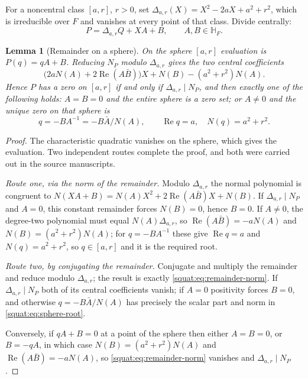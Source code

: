 \documentclass[11pt,letterpaper]{article}
\numberwithin{equation}{section}
\newtheorem{lemma}[lemma]{Lemma}
\theoremstyle{definition}
\theoremstyle{remark}
\newcommand{\HF}{\mathbb H_F}
\newcommand{\Rea}{\operatorname{Re}}
\begin{document}
For a noncentral class $[a,r]$, $r>0$, set $\Delta_{a,r}(X)=X^2-2aX+a^2+r^2$, which is
irreducible over $F$ and vanishes at every point of that class. Divide centrally:
\begin{equation}\label{squat:eq:sphereremainder}
 P=\Delta_{a,r}Q+XA+B,\qquad A,B\in\HF .
\end{equation}

\begin{lemma}[Remainder on a sphere]\label{squat:lem:sphere-remainder}
On the sphere $[a,r]$ evaluation is $P(q)=qA+B$. Reducing $N_P$ modulo $\Delta_{a,r}$
gives the two central coefficients
\begin{equation}\label{squat:eq:remainder-norm}
 \bigl(2aN(A)+2\Rea(A\bar B)\bigr)X+N(B)-(a^2+r^2)N(A).
\end{equation}
Hence $P$ has a zero on $[a,r]$ if and only if $\Delta_{a,r}\mid N_P$, and then exactly
one of the following holds: $A=B=0$ and the entire sphere is a zero set; or $A\ne0$ and
the unique zero on that sphere is
\begin{equation}\label{squat:eq:sphere-root}
 q=-BA^{-1}=-B\bar A/N(A),\qquad \Rea q=a,\quad N(q)=a^2+r^2 .
\end{equation}
\end{lemma}
\begin{proof}
The characteristic quadratic vanishes on the sphere, which gives the evaluation. Two
independent routes complete the proof, and both were carried out in the source
manuscripts.

\emph{Route one, via the norm of the remainder.} Modulo $\Delta_{a,r}$ the normal
polynomial is congruent to $N(XA+B)=N(A)X^2+2\Rea(A\bar B)X+N(B)$. If
$\Delta_{a,r}\mid N_P$ and $A=0$, this constant remainder forces $N(B)=0$, hence $B=0$.
If $A\ne0$, the degree-two polynomial must equal $N(A)\Delta_{a,r}$, so
$\Rea(A\bar B)=-aN(A)$ and $N(B)=(a^2+r^2)N(A)$; for $q=-BA^{-1}$ these give
$\Rea q=a$ and $N(q)=a^2+r^2$, so $q\in[a,r]$ and it is the required root.

\emph{Route two, by conjugating the remainder.} Conjugate and multiply the remainder and
reduce modulo $\Delta_{a,r}$; the result is exactly \cref{squat:eq:remainder-norm}. If
$\Delta_{a,r}\mid N_P$ both of its central coefficients vanish; if $A=0$ positivity
forces $B=0$, and otherwise $q=-B\bar A/N(A)$ has precisely the scalar part and norm in
\cref{squat:eq:sphere-root}.

Conversely, if $qA+B=0$ at a point of the sphere then either $A=B=0$, or $B=-qA$, in which
case $N(B)=(a^2+r^2)N(A)$ and $\Rea(A\bar B)=-aN(A)$, so
\cref{squat:eq:remainder-norm} vanishes and $\Delta_{a,r}\mid N_P$.
\end{proof}
\end{document}
